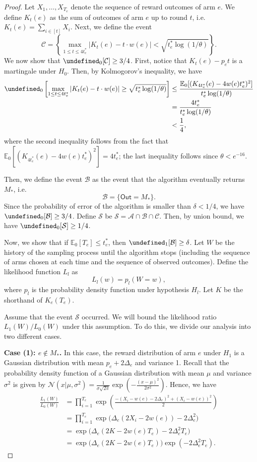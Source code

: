 \documentclass{article}
\newcommand{\E}{\mathbb E}
\newcommand{\out}{\mathsf{Out}}
\let\Pr\undefined
\DeclareMathOperator{\Pr}{Pr}
\begin{document}
\begin{spacing}{1.1}
\begin{proof}
Let $X_1,\ldots,X_{T_e}$ denote the sequence of reward outcomes of arm $e$.
We define $K_t(e)$ as the sum of outcomes of arm $e$ up to round $t$, i.e. $K_t(e) = \sum_{i\in [t]} X_i. $
Next, we define the event 
$$
\mathcal C=\left\{\max_{1\le t \le 4t_e^*} \left|K_t(e)-t\cdot w(e)\right|  < \sqrt{t_e^*\log(1/\theta)} \right\}.
$$
We now show that $\Pr_0[\mathcal C] \ge 3/4$.
First, notice that $K_t(e)-p_e t$ is a martingale under $H_0$.
Then, by Kolmogorov's inequality, we have
\begin{align*}
\Pr_0\left[\max_{1\le t \le 4t_e^*} \left|K_t(e)-t\cdot w(e)\right| \ge \sqrt{t_e^*\log(1/\theta)} \right]
&\le \frac{\E_0[ (K_{4t_e^*}(e)-4w(e)t_e^*)^2]}{t_e^*\log(1/\theta)}\\
&= \frac{4t_e^*}{t_e^*\log(1/\theta)}\\
&< \frac14,
\end{align*}
where the second inequality follows from the fact that $\E_0[(K_{4t_e^*}(e)-4w(e)t_e^*)^2] = 4t_e^*$; the last inequality follows 
since $\theta < e^{-16}$.

Then, we define the event $\mathcal B$ as the event that the algorithm eventually returns $M_*$, i.e.
$$
\mathcal B=\{\out=M_*\}.
$$
Since the probability of error of the algorithm is smaller than $\delta < 1/4$, we have $\Pr_0[\mathcal B] \ge 3/4$.
Define $\mathcal S$ be $\mathcal S=\mathcal A\cap \mathcal B \cap \mathcal C$. 
Then, by union bound, we have $\Pr_0[\mathcal S]\ge 1/4$.

Now, we show that if $\E_0[T_e] \le t_e^*$, then $\Pr_1[\mathcal B] \ge \delta$.
Let $W$ be the history of the sampling process until the algorithm stops (including the sequence of arms chosen at each time and the sequence of observed outcomes).
Define the likelihood function $L_l$ as 
$$
L_l(w) = p_l(W=w),
$$
where $p_l$ is the probability density function under hypothesis $H_l$.
Let $K$ be the shorthand of $K_e(T_e)$.

Assume that the event $\mathcal S$ occurred.
We will bound the likelihood ratio $L_1(W)/L_0(W)$ under this assumption. 
To do this, we divide our analysis into two different cases.

\textbf{Case (1): $e\not \in M_*$.}
In this case, the reward distribution of arm $e$ under $H_1$ is a Gaussian distribution with mean $p_e+2\Delta_e$ and variance 1. 
Recall that the probability density function of a Gaussian distribution with mean $\mu$ and variance $\sigma^2$ is given by
$\mathcal N(x | \mu,\sigma^2)=\frac{1}{\sigma\sqrt{2\pi}}\exp\left(-\frac{(x-\mu)^2}{2\sigma^2}\right)$.
Hence, we have
\begin{align}
  \frac{L_1(W)}{L_0(W)} &= \prod_{i=1}^{T_e} \exp\left(\frac{-(X_i-w(e)-2\Delta_e)^2+(X_i-w(e))^2}{2}\right) \nonumber \\
  						&= \prod_{i=1}^{T_e} \exp\big(\Delta_e(2X_i-2w(e))-2\Delta_e^2\big) \nonumber \\
  						&= \exp\big(\Delta_e(2K-2w(e)T_e)-2\Delta_e^2T_e\big) \nonumber \\
  						&= \exp\big(\Delta_e(2K-2w(e)T_e)\big)\exp(-2\Delta_e^2T_e) \label{eq:lower-bound-case-1}.
\end{align}


\end{proof}
\end{spacing}
\end{document}
